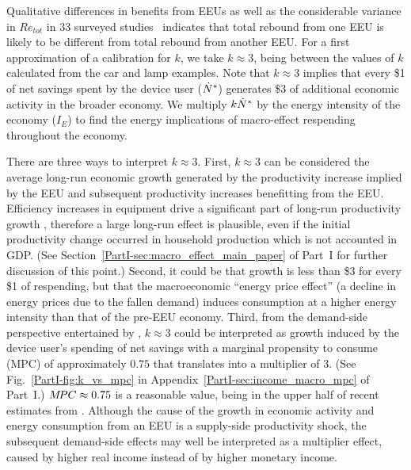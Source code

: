 \documentclass[12pt]{article}\usepackage[]{graphicx}\usepackage[]{xcolor}
\begin{document}
Qualitative differences in benefits from EEUs as well as the considerable 
variance in $Re_{tot}$ in 33 surveyed studies~\citep{Brockway:2021ww}
indicates that total rebound from one EEU is likely to be different from 
total rebound from another EEU. 
For a first approximation of a calibration for $k$,
we take $k \approx 3$,
being between the values of $k$ 
calculated from the car and lamp examples.
Note that $k \approx 3$ implies that 
every \$1 of net savings spent by the device user (${\dot{N}}^*$)
generates \$3 of additional economic 
activity in the broader economy.
We multiply $k {\dot{N}}^*$ by the energy intensity of the economy ($I_E$) to 
find the energy implications of macro-effect respending throughout the economy.

There are three ways to interpret $k \approx 3$.
First, $k \approx 3$ can be considered the average long-run 
economic growth generated
by the productivity increase implied by the EEU and subsequent
productivity increases benefitting from the EEU.
Efficiency increases in equipment drive a significant part of 
long-run productivity growth \citep{Greenwood1997}, therefore a large
long-run effect is plausible,
even if the initial productivity
change occurred in household production which is not accounted in GDP.
(See Section~\ref{PartI-sec:macro_effect_main_paper} of Part~I 
for further discussion of this point.)
Second, it could be that growth is less than 
\$3 for every \$1 of respending,
but that the macroeconomic ``energy price effect'' (a decline in 
energy prices due to the fallen demand) induces consumption at a higher
energy intensity than that of the pre-EEU economy. 
Third, from the demand-side perspective
entertained by \citet{Borenstein:2015aa}, 
$k \approx 3$ could be interpreted as 
growth induced by the device user's spending of net savings with
a marginal propensity to consume (MPC)
of approximately $0.75$ that translates into a multiplier of 3. 
(See Fig.~\ref{PartI-fig:k_vs_mpc} 
in Appendix~\ref{PartI-sec:income_macro_mpc} of Part~I.)
$M\!PC \approx 0.75$ is a reasonable value, 
being in the upper half of recent estimates from \citet{Carroll2017}.
Although the cause of the growth in economic activity and energy consumption from an EEU 
is a supply-side productivity shock,
the subsequent demand-side effects may well be interpreted as a multiplier effect, 
caused by higher real income instead of by higher monetary income.
\end{document}
